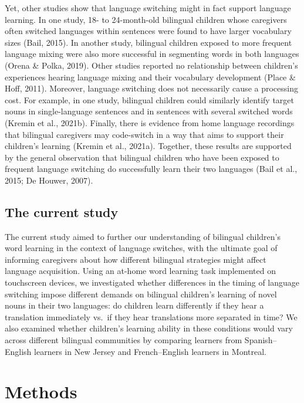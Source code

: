 \documentclass[
  man,floatsintext]{apa7}
\begin{document}
Yet, other studies show that language switching might in fact support language learning. In one study, 18- to 24-month-old bilingual children whose caregivers often switched languages within sentences were found to have larger vocabulary sizes (Bail, 2015). In another study, bilingual children exposed to more frequent language mixing were also more successful in segmenting words in both languages (Orena \& Polka, 2019). Other studies reported no relationship between children's experiences hearing language mixing and their vocabulary development (Place \& Hoff, 2011). Moreover, language switching does not necessarily cause a processing cost. For example, in one study, bilingual children could similarly identify target nouns in single-language sentences and in sentences with several switched words (Kremin et al., 2021b). Finally, there is evidence from home language recordings that bilingual caregivers may code-switch in a way that aims to support their children's learning (Kremin et al., 2021a). Together, these results are supported by the general observation that bilingual children who have been exposed to frequent language switching do successfully learn their two languages (Bail et al., 2015; De Houwer, 2007).

\hypertarget{the-current-study}{%
\subsection{The current study}\label{the-current-study}}

The current study aimed to further our understanding of bilingual children's word learning in the context of language switches, with the ultimate goal of informing caregivers about how different bilingual strategies might affect language acquisition. Using an at-home word learning task implemented on touchscreen devices, we investigated whether differences in the timing of language switching impose different demands on bilingual children's learning of novel nouns in their two languages: do children learn differently if they hear a translation immediately vs.~if they hear translations more separated in time? We also examined whether children's learning ability in these conditions would vary across different bilingual communities by comparing learners from Spanish--English learners in New Jersey and French--English learners in Montreal.

\hypertarget{methods}{%
\section{Methods}\label{methods}}
\end{document}
